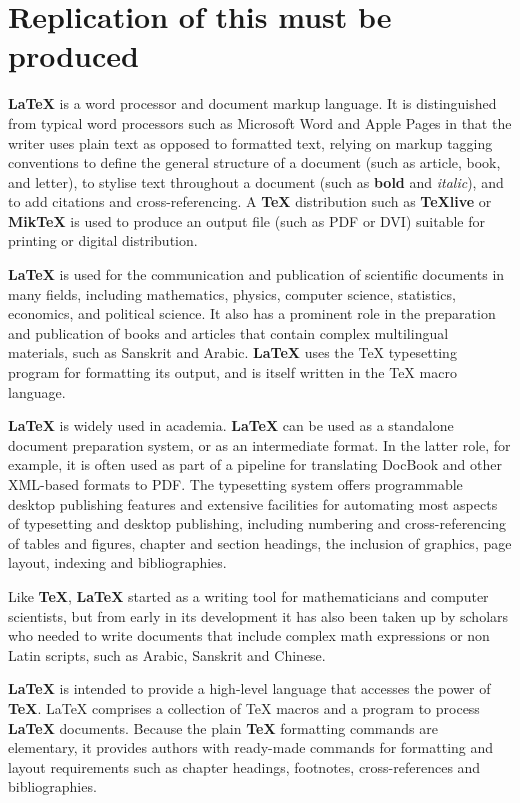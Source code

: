 \documentclass[11pt,a4paper]{article}
\begin{document}
\section{Replication of this must be produced}
\textbf{LaTeX} is a word processor and document markup language. It is
distinguished from typical word processors such as Microsoft Word and Apple
Pages in that the writer uses plain text as opposed to formatted text,
relying on markup tagging conventions to define the general structure of a
document (such as article, book, and letter), to stylise text throughout a
document (such as \textbf{bold} and \textit{italic}), and to add citations
and cross-referencing. A \textbf{TeX} distribution such as \textbf{TeXlive}
or \textbf{MikTeX} is used to produce an output file (such as PDF or DVI)
suitable for printing or digital distribution.

\bigskip
\textbf{LaTeX} is used for the communication and publication of scientific
documents in many fields, including mathematics, physics, computer science,
statistics, economics, and political science. It also has a prominent role in
the preparation and publication of books and articles that contain complex
multilingual materials, such as Sanskrit and Arabic. \textbf{LaTeX} uses the
TeX typesetting program for formatting its output, and is itself written in
the TeX macro language.

\bigskip
\textbf{LaTeX} is widely used in academia. \textbf{LaTeX} can be used as a
standalone document preparation system, or as an intermediate format. In the
latter role, for example, it is often used as part of a pipeline for
translating DocBook and other XML-based formats to PDF. The typesetting
system offers programmable desktop publishing features and extensive
facilities for automating most aspects of typesetting and desktop publishing,
including numbering and cross-referencing of tables and figures, chapter and
section headings, the inclusion of graphics, page layout, indexing and
bibliographies.

\bigskip
Like \textbf{TeX}, \textbf{LaTeX} started as a writing tool for
mathematicians and computer scientists, but from early in its development it
has also been taken up by scholars who needed to write documents that include
complex math expressions or non Latin scripts, such as Arabic, Sanskrit and
Chinese.

\bigskip
\textbf{LaTeX} is intended to provide a high-level language that accesses the
power of \textbf{TeX}. \LaTeX{} comprises a collection of TeX macros and a
program to process \textbf{LaTeX} documents. Because the plain \textbf{TeX}
formatting commands are elementary, it provides authors with ready-made
commands for formatting and layout requirements such as chapter headings,
footnotes, cross-references and bibliographies.
\end{document}
